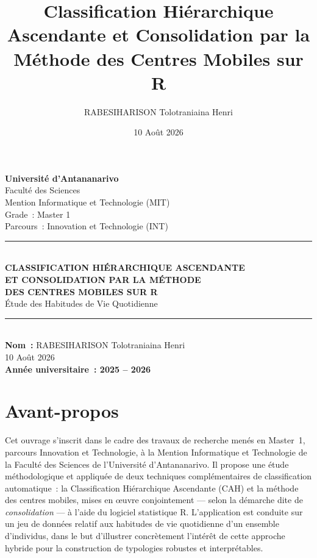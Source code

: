 \documentclass[11pt,a4paper,oneside]{book}
\title{Classification Hiérarchique Ascendante et Consolidation par la Méthode des Centres Mobiles sur R}
\author{RABESIHARISON Tolotraniaina Henri}
\date{10 Août 2026}
\begin{document}
\begin{titlepage}
\centering
\vspace*{0.5cm}
{\large\bfseries Université d'Antananarivo}\\[0.3cm]
{\large Faculté des Sciences}\\[0.3cm]
{\large Mention Informatique et Technologie (MIT)}\\[0.2cm]
{\large Grade~: Master 1}\\[0.2cm]
{\large Parcours~: Innovation et Technologie (INT)}\\[2cm]

\rule{\linewidth}{0.5pt}\\[0.6cm]
{\Huge\bfseries CLASSIFICATION HIÉRARCHIQUE ASCENDANTE\\[0.3cm] ET CONSOLIDATION PAR LA MÉTHODE\\[0.3cm] DES CENTRES MOBILES SUR R\\[0.5cm]}
{\Large \'Etude des Habitudes de Vie Quotidienne}\\[0.6cm]
\rule{\linewidth}{0.5pt}\\[2.5cm]

{\large \textbf{Nom~:} RABESIHARISON Tolotraniaina Henri}\\[2cm]

\vfill
{\large 10 Août 2026}\\[0.3cm]
{\large\bfseries Année universitaire~: 2025 -- 2026}
\end{titlepage}

\frontmatter
\tableofcontents
\listoffigures
\listoftables

\chapter*{Avant-propos}
Cet ouvrage s'inscrit dans le cadre des travaux de recherche menés en Master~1, parcours Innovation et Technologie, à la Mention Informatique et Technologie de la Faculté des Sciences de l'Université d'Antananarivo. Il propose une étude méthodologique et appliquée de deux techniques complémentaires de classification automatique~: la Classification Hiérarchique Ascendante (CAH) et la méthode des centres mobiles, mises en \oe uvre conjointement --- selon la démarche dite de \emph{consolidation} --- à l'aide du logiciel statistique R. L'application est conduite sur un jeu de données relatif aux habitudes de vie quotidienne d'un ensemble d'individus, dans le but d'illustrer concrètement l'intérêt de cette approche hybride pour la construction de typologies robustes et interprétables.
\end{document}
